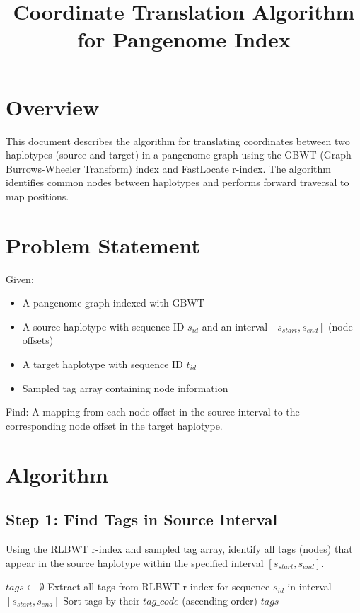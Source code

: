 \documentclass[11pt]{article}
\title{Coordinate Translation Algorithm for Pangenome Index}
\author{}
\date{}
\begin{document}
\maketitle

\section{Overview}

This document describes the algorithm for translating coordinates between two haplotypes (source and target) in a pangenome graph using the GBWT (Graph Burrows-Wheeler Transform) index and FastLocate r-index. The algorithm identifies common nodes between haplotypes and performs forward traversal to map positions.

\section{Problem Statement}

Given:
\begin{itemize}
    \item A pangenome graph indexed with GBWT
    \item A source haplotype with sequence ID $s_{id}$ and an interval $[s_{start}, s_{end}]$ (node offsets)
    \item A target haplotype with sequence ID $t_{id}$
    \item Sampled tag array containing node information
\end{itemize}

Find: A mapping from each node offset in the source interval to the corresponding node offset in the target haplotype.

\section{Algorithm}

\subsection{Step 1: Find Tags in Source Interval}

Using the RLBWT r-index and sampled tag array, identify all tags (nodes) that appear in the source haplotype within the specified interval $[s_{start}, s_{end}]$.

\begin{algorithmic}[1]
    \State $tags \gets \emptyset$
    \State Extract all tags from RLBWT r-index for sequence $s_{id}$ in interval $[s_{start}, s_{end}]$
    \State Sort tags by their $tag\_code$ (ascending order)
    \State \Return $tags$
\end{algorithmic}
\end{document}
